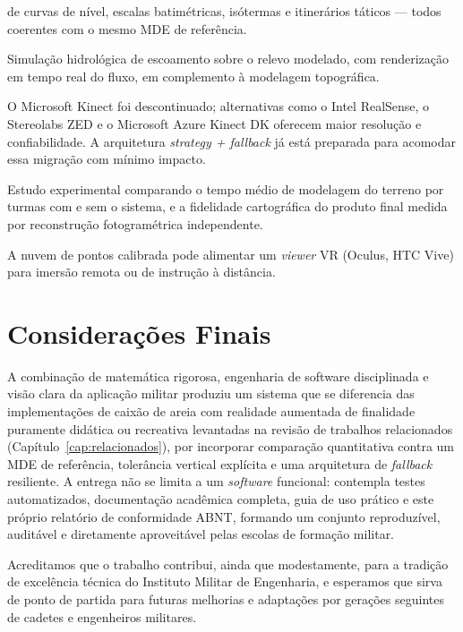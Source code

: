 \begin{description}
          de curvas de nível, escalas batimétricas, isótermas e
          itinerários táticos — todos coerentes com o mesmo MDE de
          referência.
    \item[Integração com SARAS-FFT (Águas Pluviais).] Simulação
          hidrológica de escoamento sobre o relevo modelado, com
          renderização em tempo real do fluxo, em complemento à
          modelagem topográfica.
    \item[Substituição do Kinect por sensor moderno.] O Microsoft
          Kinect foi descontinuado; alternativas como o
          Intel RealSense, o Stereolabs ZED e o
          Microsoft Azure Kinect DK oferecem maior
          resolução e confiabilidade. A arquitetura
          \textit{strategy + fallback} já está preparada para
          acomodar essa migração com mínimo impacto.
    \item[Validação em escola militar.] Estudo experimental
          comparando o tempo médio de modelagem do terreno por
          turmas com e sem o sistema, e a fidelidade cartográfica
          do produto final medida por reconstrução fotogramétrica
          independente.
    \item[Exportação para realidade virtual.] A nuvem de pontos
          calibrada pode alimentar um \textit{viewer} VR (Oculus,
          HTC Vive) para imersão remota ou de instrução à distância.
\end{description}

\section{Considerações Finais}

A combinação de matemática rigorosa, engenharia de software
disciplinada e visão clara da aplicação militar produziu um sistema
que se diferencia das implementações de caixão de areia com realidade
aumentada de finalidade puramente didática ou recreativa levantadas na
revisão de trabalhos relacionados (Capítulo~\ref{cap:relacionados}),
por incorporar comparação quantitativa contra um MDE de referência,
tolerância vertical explícita e uma arquitetura de \textit{fallback}
resiliente. A entrega não se limita a um \textit{software} funcional: contempla
testes automatizados, documentação acadêmica completa, guia de uso
prático e este próprio relatório de conformidade ABNT, formando um
conjunto reproduzível, auditável e diretamente aproveitável pelas
escolas de formação militar.

Acreditamos que o trabalho contribui, ainda que modestamente, para
a tradição de excelência técnica do Instituto Militar de
Engenharia, e esperamos que sirva de ponto de partida para futuras
melhorias e adaptações por gerações seguintes de cadetes e
engenheiros militares.
